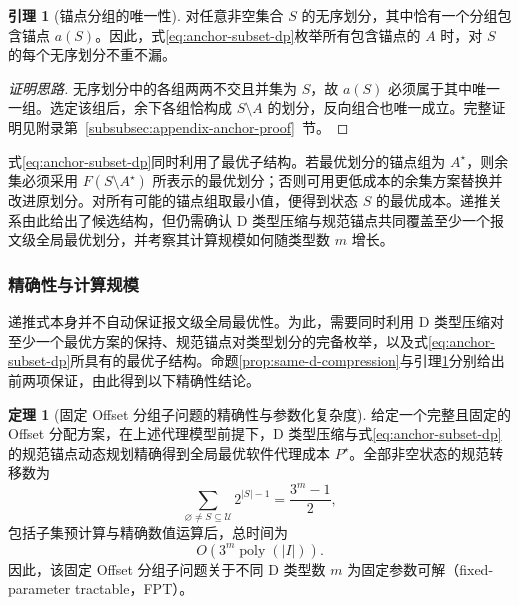 \documentclass[UTF8,a4paper,twoside,zihao=-4]{ctexart}
\numberwithin{equation}{section}
\numberwithin{figure}{section}
\numberwithin{table}{section}
\theoremstyle{definition}
\newtheorem{lemma}{引理}
\newtheorem{theorem}{定理}
\numberwithin{algocf}{section}
\begin{document}
\begin{lemma}[锚点分组的唯一性]
\label{lem:anchor-block-uniqueness}
对任意非空集合 $S$ 的无序划分，其中恰有一个分组包含锚点 $a(S)$。因此，式\eqref{eq:anchor-subset-dp}枚举所有包含锚点的 $A$ 时，对 $S$ 的每个无序划分不重不漏。
\end{lemma}

\begin{proof}[\normalfont 证明思路]
无序划分中的各组两两不交且并集为 $S$，故 $a(S)$ 必须属于其中唯一一组。选定该组后，余下各组恰构成 $S\setminus A$ 的划分，反向组合也唯一成立。完整证明见附录第~\ref{subsubsec:appendix-anchor-proof}~节。
\end{proof}

式\eqref{eq:anchor-subset-dp}同时利用了最优子结构。若最优划分的锚点组为 $A^\star$，则余集必须采用 $F(S\setminus A^\star)$ 所表示的最优划分；否则可用更低成本的余集方案替换并改进原划分。对所有可能的锚点组取最小值，便得到状态 $S$ 的最优成本。递推关系由此给出了候选结构，但仍需确认 D 类型压缩与规范锚点共同覆盖至少一个报文级全局最优划分，并考察其计算规模如何随类型数 $m$ 增长。

\subsubsection{精确性与计算规模}
\label{subsubsec:dp-exactness-complexity}

递推式本身并不自动保证报文级全局最优性。为此，需要同时利用 D 类型压缩对至少一个最优方案的保持、规范锚点对类型划分的完备枚举，以及式\eqref{eq:anchor-subset-dp}所具有的最优子结构。命题\ref{prop:same-d-compression}与引理\ref{lem:anchor-block-uniqueness}分别给出前两项保证，由此得到以下精确性结论。

\begin{theorem}[固定 Offset 分组子问题的精确性与参数化复杂度]
\label{thm:fixed-offset-dp-exactness}
给定一个完整且固定的 Offset 分配方案，在上述代理模型前提下，D 类型压缩与式\eqref{eq:anchor-subset-dp}的规范锚点动态规划精确得到全局最优软件代理成本 $P^\star$。全部非空状态的规范转移数为
\begin{equation}
 \sum_{\varnothing\ne S\subseteq\mathcal U}2^{|S|-1}
 =\frac{3^m-1}{2},
\label{eq:anchor-transition-count}
\end{equation}
包括子集预计算与精确数值运算后，总时间为
\begin{equation}
 O\!\left(3^m\operatorname{poly}(|I|)\right).
\label{eq:fixed-offset-fpt-time}
\end{equation}
因此，该固定 Offset 分组子问题关于不同 D 类型数 $m$ 为固定参数可解（fixed-parameter tractable，FPT）。
\end{theorem}
\end{document}
